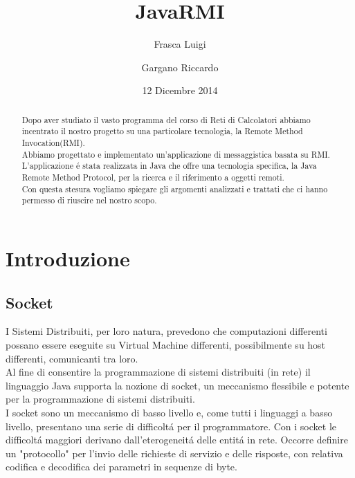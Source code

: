 \documentclass[a4paper, 12 pt, italian]{report}
\begin{document}
\title{JavaRMI}

\author{Frasca Luigi \and Gargano Riccardo}
\date{12 Dicembre 2014}


\maketitle

\begin{abstract}
Dopo aver studiato il vasto programma del corso di Reti di Calcolatori abbiamo incentrato il nostro progetto su una particolare tecnologia, la Remote Method Invocation(RMI).\\
Abbiamo progettato e implementato un'applicazione di messaggistica basata su RMI.\\
L'applicazione \'e stata realizzata in Java che offre una tecnologia specifica, la Java Remote Method Protocol, per la ricerca e il riferimento a oggetti remoti.\\
Con questa stesura vogliamo spiegare gli argomenti analizzati e trattati che ci hanno permesso di riuscire nel nostro scopo.

\end{abstract}


\tableofcontents


\chapter{Introduzione}
\section{Socket}

I Sistemi Distribuiti, per loro natura, prevedono che computazioni differenti possano essere eseguite su Virtual Machine differenti, possibilmente su host differenti, comunicanti tra loro.\\
Al fine di consentire la programmazione di sistemi distribuiti (in rete) il linguaggio Java supporta la nozione di socket, un meccanismo flessibile e potente per la programmazione di sistemi distribuiti.\\
I socket sono un meccanismo di basso livello e, come tutti i linguaggi a basso livello, presentano una serie di difficolt\'a per il programmatore.
Con i socket le difficolt\'a maggiori derivano dall'eterogeneit\'a delle entit\'a in rete. Occorre definire un "protocollo" per l'invio delle richieste di servizio e delle risposte, con relativa codifica e decodifica dei parametri in sequenze di byte.
\end{document}
